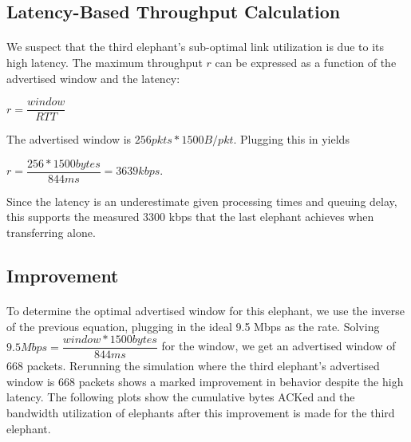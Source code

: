 \documentclass{article}
\begin{document}
    \subsection{Latency-Based Throughput Calculation}
      \paragraph{}
        We suspect that the third elephant's sub-optimal link utilization is due to its high latency.
        The maximum throughput $r$ can be expressed as a function of the advertised window and the latency:
        \begin{center}
          $r = \dfrac{window}{RTT}$
        \end{center}
        The advertised window is $256 pkts * 1500 B/pkt$.
        Plugging this in yields
        \begin{center}
          $r = \dfrac{256 * 1500 bytes}{844 ms} = 3639 kbps$.
        \end{center}
        Since the latency is an underestimate given processing times and queuing delay, this supports the measured 3300 kbps that the last elephant achieves when transferring alone.

    \subsection{Improvement}
      \paragraph{}
        To determine the optimal advertised window for this elephant, we use the inverse of the previous equation, plugging in the ideal 9.5 Mbps as the rate.
        Solving $9.5 Mbps = \dfrac{window * 1500 bytes}{844 ms}$ for the window, we get an advertised window of 668 packets.
        Rerunning the simulation where the third elephant's advertised window is 668 packets shows a marked improvement in behavior despite the high latency.
        The following plots show the cumulative bytes ACKed and the bandwidth utilization of elephants after this improvement is made for the third elephant.
\end{document}
